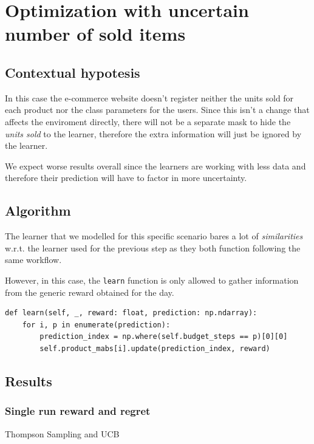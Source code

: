 \chapter{Optimization with uncertain number of sold items}
\label{chap:unc_items}

\section{Contextual hypotesis}

In this case the e-commerce website doesn't register neither the units sold for each product nor the class parameters for the users.
Since this isn't a change that affects the enviroment directly, there will not be a separate mask to hide the \textit{units sold} to the learner, therefore the extra information will just be ignored by the learner.

We expect worse results overall since the learners are working with less data and therefore their prediction will have to factor in more uncertainty.

\section{Algorithm}

The learner that we modelled for this specific scenario bares a lot of \textit{similarities} w.r.t. the learner used for the previous step as they both function following the same workflow.

However, in this case, the \texttt{learn} function is only allowed to gather information from the generic reward obtained for the day.

\begin{lstlisting}[style=Python]
def learn(self, _, reward: float, prediction: np.ndarray):
	for i, p in enumerate(prediction):
		prediction_index = np.where(self.budget_steps == p)[0][0]
		self.product_mabs[i].update(prediction_index, reward)
\end{lstlisting}

\section{Results}

\subsection{Single run reward and regret}

Thompson Sampling and UCB

